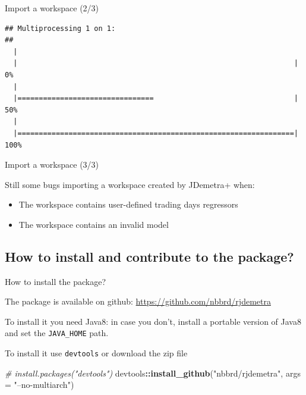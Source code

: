 \documentclass[10pt,xcolor=table,color={dvipsnames,usenames},ignorenonframetext,usepdftitle=false,french]{beamer}
\newenvironment{Shaded}{\begin{snugshade}}{\end{snugshade}}
\newcommand{\KeywordTok}[1]{\textcolor[rgb]{0.13,0.29,0.53}{\textbf{#1}}}
\newcommand{\DataTypeTok}[1]{\textcolor[rgb]{0.13,0.29,0.53}{#1}}
\newcommand{\StringTok}[1]{\textcolor[rgb]{0.31,0.60,0.02}{#1}}
\newcommand{\CommentTok}[1]{\textcolor[rgb]{0.56,0.35,0.01}{\textit{#1}}}
\newcommand{\OperatorTok}[1]{\textcolor[rgb]{0.81,0.36,0.00}{\textbf{#1}}}
\newcommand{\NormalTok}[1]{#1}
\begin{document}
\begin{frame}[fragile]{Import a workspace (2/3)}
\begin{verbatim}
## Multiprocessing 1 on 1:
## 
  |                                                                       
  |                                                                 |   0%
  |                                                                       
  |================================                                 |  50%
  |                                                                       
  |=================================================================| 100%
\end{verbatim}

\end{frame}

\begin{frame}{Import a workspace (3/3)}

\bcsmmh Still some bugs importing a workspace created by JDemetra+ when:

\begin{itemize}
\item
  The workspace contains user-defined trading days regressors
\item
  The workspace contains an invalid model
\end{itemize}

\end{frame}

\subsection{How to install and contribute to the
package?}\label{how-to-install-and-contribute-to-the-package}

\begin{frame}[fragile]{How to install the package?}

The package is available on github:
\url{https://github.com/nbbrd/rjdemetra}

\bcinfo To install it you need Java8: in case you don't, install a
portable version of Java8 and set the \texttt{JAVA\_HOME} path.

To install it use \texttt{devtools} or download the zip file

\begin{Shaded}
\begin{Highlighting}[]
\CommentTok{# install.packages("devtools")}
\NormalTok{devtools}\OperatorTok{::}\KeywordTok{install_github}\NormalTok{(}\StringTok{"nbbrd/rjdemetra"}\NormalTok{,}
                         \DataTypeTok{args =} \StringTok{"--no-multiarch"}\NormalTok{)}
\end{Highlighting}
\end{Shaded}

\end{frame}
\end{document}
